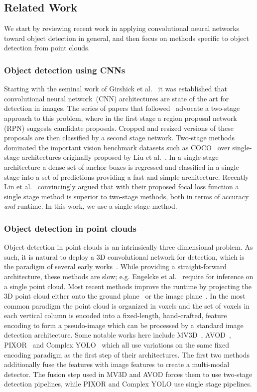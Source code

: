 \documentclass[10pt,twocolumn,letterpaper]{article}
\newcommand{\squeeze}{\vspace{-0.5mm}}
\begin{document}
\subsection{Related Work}
\squeeze
We start by reviewing recent work in applying convolutional neural networks toward object detection in general, and then focus on methods specific to object detection from \lidar point clouds.

\squeeze
\subsubsection{Object detection using CNNs}
\squeeze
Starting with the seminal work of Girshick et al.~\cite{girshick2014rich} it was established that convolutional neural network~(CNN) architectures are state of the art for detection in images.
The series of papers that followed~\cite{ren2015faster, he2017mask} advocate a two-stage approach to this problem, where in the first stage a region proposal network (RPN) suggests candidate proposals.
Cropped and resized versions of these proposals are then classified by a second stage network.
Two-stage methods dominated the important vision benchmark datasets such as COCO~\cite{coco} over single-stage architectures originally proposed by Liu et al.~\cite{ssd}.
In a single-stage architecture a dense set of anchor boxes is regressed and classified in a single stage into a set of predictions providing a fast and simple architecture.
Recently Lin et al.~\cite{retinanet} convincingly argued that with their proposed focal loss function a single stage method is superior to two-stage methods, both in terms of accuracy \emph{and} runtime. 
In this work, we use a single stage method.

\squeeze
\subsubsection{Object detection in \lidar point clouds}
\squeeze
Object detection in point clouds is an intrinsically three dimensional problem.
As such, it is natural to deploy a 3D convolutional network for detection, which is the paradigm of several early works~\cite{engelcke2017vote3deep,li20173d}.
While providing a straight-forward architecture, these methods are slow; e.g. Engelcke et al.~\cite{engelcke2017vote3deep} require  for inference on a single point cloud.
Most recent methods improve the runtime by projecting the 3D point cloud either onto the ground plane~\cite{avod, mv3d} or the image plane~\cite{fcl}.
In the most common paradigm the point cloud is organized in voxels and the set of voxels in each vertical column is encoded into a fixed-length, hand-crafted, feature encoding to form a pseudo-image which can be processed by a standard image detection architecture.
Some notable works here include MV3D~\cite{mv3d}, AVOD~\cite{avod}, PIXOR~\cite{pixor} and Complex YOLO~\cite{complexyolo} which all use variations on the same fixed encoding paradigm as the first step of their architectures.
The first two methods additionally fuse the \lidar features with image features to create a multi-modal detector.
The fusion step used in MV3D and AVOD forces them to use two-stage detection pipelines, while PIXOR and Complex YOLO use single stage pipelines.
\end{document}
